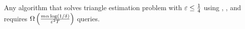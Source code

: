
\begin{theorem}\label{Theorem: Lower Bound on Triangle Counting through PTP}
Any algorithm that solves triangle estimation problem with $\varepsilon \leq \frac{1}{4}$ using \degreeq{}, \neighbourq{}, \edgeexistsq{} and \randedgeq{} requires $\Omega\left({\frac{m\alpha\log\left({1/\delta}\right)}{\varepsilon^2T}}\right)$ queries.    
\end{theorem}

